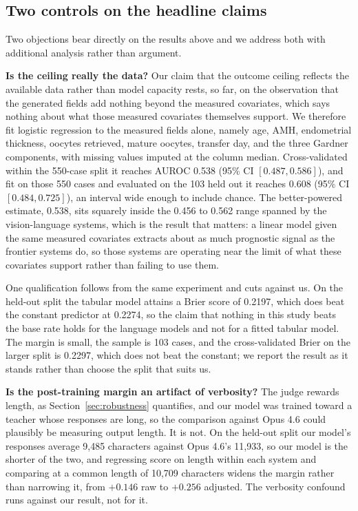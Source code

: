 \documentclass[11pt]{article}
\begin{document}
\subsection{Two controls on the headline claims}
\label{sec:controls}

Two objections bear directly on the results above and we address both with
additional analysis rather than argument.

\textbf{Is the ceiling really the data?} Our claim that the outcome ceiling
reflects the available data rather than model capacity rests, so far, on the
observation that the generated fields add nothing beyond the measured covariates,
which says nothing about what those measured covariates themselves support. We therefore fit logistic regression to the
measured fields alone, namely age, AMH, endometrial thickness, oocytes retrieved,
mature oocytes, transfer day, and the three Gardner components, with missing
values imputed at the column median. Cross-validated within the 550-case split it
reaches AUROC 0.538 (95\% CI $[0.487, 0.586]$), and fit on those 550 cases and
evaluated on the 103 held out it reaches 0.608 (95\% CI $[0.484, 0.725]$), an
interval wide enough to include chance. The better-powered estimate, 0.538, sits
squarely inside the 0.456 to 0.562 range spanned by the vision-language systems,
which is the result that matters: a linear model given the same measured
covariates extracts about as much prognostic signal as the frontier systems do,
so those systems are operating near the limit of what these covariates support
rather than failing to use them.

One qualification follows from the same experiment and cuts against us. On the
held-out split the tabular model attains a Brier score of 0.2197, which does beat
the constant predictor at 0.2274, so the claim that nothing in this study beats
the base rate holds for the language models and not for a fitted tabular model.
The margin is small, the sample is 103 cases, and the cross-validated Brier on
the larger split is 0.2297, which does not beat the constant; we report the
result as it stands rather than choose the split that suits us.

\textbf{Is the post-training margin an artifact of verbosity?} The judge rewards
length, as Section~\ref{sec:robustness} quantifies, and our model was trained
toward a teacher whose responses are long, so the comparison against Opus 4.6
could plausibly be measuring output length. It is not. On the held-out split our
model's responses average 9,485 characters against Opus 4.6's 11,933, so our
model is the shorter of the two, and regressing score on length within each
system and comparing at a common length of 10,709 characters widens the margin
rather than narrowing it, from $+0.146$ raw to $+0.256$ adjusted. The verbosity
confound runs against our result, not for it.
\end{document}
